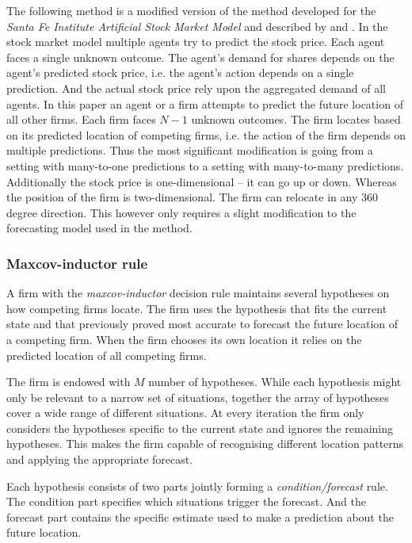 \documentclass[preprint, 12pt]{elsarticle}
\begin{document}
The following method is a modified version of the method developed for the \emph{Santa Fe Institute Artificial Stock Market Model} and described by \citet[chapter~3]{Arthur_2014} and \citet{Arthur_Holland_LeBaron_Palmer_Tayler_1996}. In the stock market model multiple agents try to predict the stock price. Each agent faces a single unknown outcome. The agent's demand for shares depends on the agent's predicted stock price, i.e. the agent's action depends on a single prediction. And the actual stock price rely upon the aggregated demand of all agents. In this paper an agent or a firm attempts to predict the future location of all other firms. Each firm faces $N-1$ unknown outcomes. The firm locates based on its predicted location of competing firms, i.e. the action of the firm depends on multiple predictions. Thus the most significant modification is going from a setting with many-to-one predictions to a setting with many-to-many predictions. Additionally the stock price is one-dimensional -- it can go up or down. Whereas the position of the firm is two-dimensional. The firm can relocate in any 360 degree direction. This however only requires a slight modification to the forecasting model used in the method.

\subsubsection{Maxcov-inductor rule}
\label{sec:mi}

A firm with the \emph{maxcov-inductor} decision rule maintains several hypotheses on how competing firms locate. The firm uses the hypothesis that fits the current state and that previously proved most accurate to forecast the future location of a competing firm. When the firm chooses its own location it relies on the predicted location of all competing firms.

The firm is endowed with $M$ number of hypotheses. While each hypothesis might only be relevant to a narrow set of situations, together the array of hypotheses cover a wide range of different situations. At every iteration the firm only considers the hypotheses specific to the current state and ignores the remaining hypotheses. This makes the firm capable of recognising different location patterns and applying the appropriate forecast.

Each hypothesis consists of two parts jointly forming a \emph{condition/forecast} rule. The condition part specifies which situations trigger the forecast. And the forecast part contains the specific estimate used to make a prediction about the future location.
\end{document}
